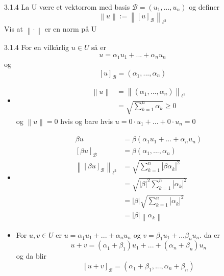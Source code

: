 \documentclass[a4paper,norsk]{article}
\renewcommand{\geq}{\geqslant}
\begin{document}
\begin{oppgavebox}{3.1.4}{}
La U være et vektorrom med basis $ \mathcal{B} = \left( u_1, ..., u_n \right)  $ og definer 
\[
    \left\lVert u \right\rVert := \left\lVert \left[ u \right] _{\mathcal{B}} \right\rVert_{\ell^2} 
\]
Vis at $ \left\lVert \cdot \right\rVert  $ er en norm på U

\begin{proofbox}{3.1.4}{}
For en vilkårlig $ u \in  U $ så er 
\[
    u = \alpha_{1}^{} u_1 + ... + \alpha_{n}^{} u_n
\]
og \[
    \left[ u \right] _{\mathcal{B}} = \left( \alpha_{1}^{} , ..., \alpha_{n}^{}  \right) 
\]

\begin{itemize}
    \item \begin{align*}
        \left\lVert u \right\rVert &= \left\lVert \left( \alpha_{1}^{} , ..., \alpha_{n}^{}  \right)  \right\rVert_{\ell^2} \\
        &= \sqrt{ \sum_{ k=1 }^{ n } \alpha_{k}^{}  } \geq 0 
    \end{align*}
    og $ \left\lVert u \right\rVert = 0 $ hvis og bare hvis $ u = 0 \cdot u_1 + ... + 0 \cdot u_n =0$
    \item \begin{align*}
        \beta u &= \beta \left( \alpha_{1}^{} u_1 + ... + \alpha_{n}^{} u_n \right) \\
        \left[ \beta u \right] _{\mathcal{B}} &= \beta \left( \alpha_{1}^{} , ..., \alpha_{n}^{}  \right) \\
        \left\lVert  \left[ \beta u \right]_{\mathcal{B}}  \right\rVert _{\ell^2} &= \sqrt{ \sum_{ k=1 }^{ n } \left| \beta \alpha_{k}^{}  \right|^2  } \\
        &= \sqrt{ \left| \beta \right| ^2 \sum_{ k=1 }^{ n } \left| \alpha_{k}^{}  \right|^2   }\\
        &= \left| \beta \right| \sqrt{ \sum_{ k=1 }^{ n } \left| \alpha_{k}^{}  \right|^2  } \\
        &= \left| \beta \right| \left\lVert \alpha_{k}^{}  \right\rVert 
    \end{align*}
    \item For $ u, v \in U $ er $ u = \alpha_{1}^{} u_1 + ... + \alpha_{n}^{} u_n $ og $ v = \beta_1 u_1 + ... \beta_n u_n $. da er
    \[
        u + v = \left( \alpha_{1}^{} + \beta_1 \right) u_1 + ... + \left( \alpha_{n}^{} + \beta_n \right)u_n 
    \]
    og da blir
    \[
        \left[ u + v \right] _{\mathcal{B}} = \left( \alpha_{1}^{} + \beta_1, ..., \alpha_{n}^{} + \beta_n \right) 
    \]


\end{itemize}
\end{proofbox}
\end{oppgavebox}
\end{document}
